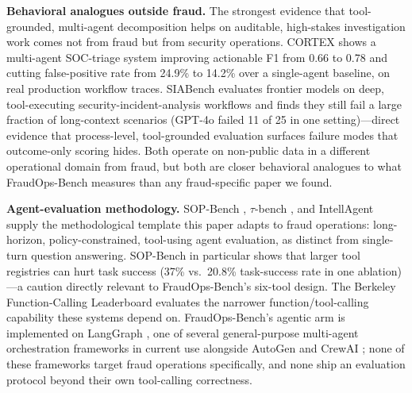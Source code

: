 \documentclass[]{ieeeaccess}
\begin{document}
\textbf{Behavioral analogues outside fraud.} The strongest evidence that
tool-grounded, multi-agent decomposition helps on auditable, high-stakes
investigation work comes not from fraud but from security operations.
CORTEX \cite{cortex2025} shows a multi-agent SOC-triage system improving
actionable F1 from 0.66 to 0.78 and cutting false-positive rate from
24.9\% to 14.2\% over a single-agent baseline, on real production
workflow traces. SIABench \cite{siabench2026} evaluates frontier models
on deep, tool-executing security-incident-analysis workflows and finds
they still fail a large fraction of long-context scenarios (GPT-4o failed
11 of 25 in one setting)---direct evidence that process-level,
tool-grounded evaluation surfaces failure modes that outcome-only scoring
hides. Both operate on non-public data in a different operational domain
from fraud, but both are closer behavioral analogues to what
FraudOps-Bench measures than any fraud-specific paper we found.

\textbf{Agent-evaluation methodology.} SOP-Bench \cite{sopbench2025},
$\tau$-bench \cite{taubench2024}, and IntellAgent \cite{intellagent2025}
supply the methodological template this paper adapts to fraud operations:
long-horizon, policy-constrained, tool-using agent evaluation, as
distinct from single-turn question answering. SOP-Bench in particular
shows that larger tool registries can hurt task success (37\% vs.\
20.8\% task-success rate in one ablation)---a caution directly relevant
to FraudOps-Bench's six-tool design. The Berkeley Function-Calling
Leaderboard \cite{bfcl2025} evaluates the narrower function/tool-calling
capability these systems depend on. FraudOps-Bench's agentic arm is
implemented on LangGraph \cite{langgraph2024}, one of several
general-purpose multi-agent orchestration frameworks in current use
alongside AutoGen \cite{autogen2023} and CrewAI \cite{crewai2023}; none of
these frameworks target fraud operations specifically, and none ship an
evaluation protocol beyond their own tool-calling correctness.
\end{document}
